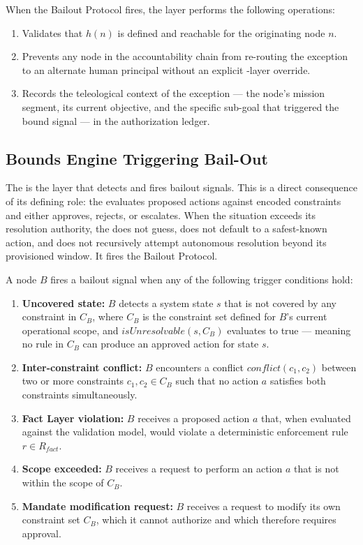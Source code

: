 When the Bailout Protocol fires, the \purpose{} layer performs the following operations:

\begin{enumerate}
\item Validates that $h(n)$ is defined and reachable for the originating node $n$.
\item Prevents any node in the accountability chain from re-routing the exception to an alternate human principal without an explicit \purpose{}-layer override.
\item Records the teleological context of the exception — the node's mission segment, its current objective, and the specific sub-goal that triggered the bound signal — in the authorization ledger.
\end{enumerate}

\subsection{Bounds Engine Triggering Bail-Out}
\label{sec:bounds-trigger}

The \bounds{} is the layer that detects and fires bailout signals. This is a direct consequence of its defining role: the \bounds{} evaluates proposed actions against encoded constraints and either approves, rejects, or escalates. When the situation exceeds its resolution authority, the \bounds{} does not guess, does not default to a safest-known action, and does not recursively attempt autonomous resolution beyond its provisioned window. It fires the Bailout Protocol.

A \bounds{} node $B$ fires a bailout signal when any of the following trigger conditions hold:

\begin{enumerate}
\item \textbf{Uncovered state:} $B$ detects a system state $s$ that is not covered by any constraint in $C_B$, where $C_B$ is the constraint set defined for $B$'s current operational scope, and $isUnresolvable(s, C_B)$ evaluates to true — meaning no rule in $C_B$ can produce an approved action for state $s$.
\item \textbf{Inter-constraint conflict:} $B$ encounters a conflict $conflict(c_1, c_2)$ between two or more constraints $c_1, c_2 \in C_B$ such that no action $a$ satisfies both constraints simultaneously.
\item \textbf{Fact Layer violation:} $B$ receives a proposed action $a$ that, when evaluated against the \fact{} validation model, would violate a deterministic enforcement rule $r \in R_{fact}$.
\item \textbf{Scope exceeded:} $B$ receives a request to perform an action $a$ that is not within the scope of $C_B$.
\item \textbf{Mandate modification request:} $B$ receives a request to modify its own constraint set $C_B$, which it cannot authorize and which therefore requires \purpose{} approval.
\end{enumerate}

